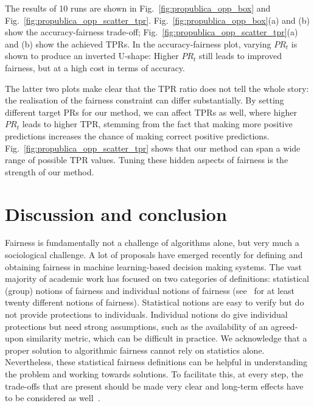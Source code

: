 The results of 10 runs are shown in Fig.~\ref{fig:propublica_opp_box} and Fig.~\ref{fig:propublica_opp_scatter_tpr}.
Fig.~\ref{fig:propublica_opp_box}(a) and (b) show the accuracy-fairness trade-off;
Fig.~\ref{fig:propublica_opp_scatter_tpr}(a) and (b) show the achieved TPRs.
In the accuracy-fairness plot, varying $\mathit{PR}_t$ is shown to produce an inverted U-shape:
Higher $\mathit{PR}_t$ still leads to improved fairness, but at a high cost in terms of accuracy.

The latter two plots make clear that the TPR ratio does not tell the whole story:
the realisation of the fairness constraint can differ substantially.
By setting different target PRs for our method, we can affect TPRs as well,
where higher $\mathit{PR}_t$ leads to higher TPR,
stemming from the fact that making more positive predictions increases the chance of making correct positive predictions.
Fig.~\ref{fig:propublica_opp_scatter_tpr} shows that our method can span a wide range of possible TPR values.
Tuning these hidden aspects of fairness is the strength of our method.

\section{Discussion and conclusion}
Fairness is fundamentally not a challenge of algorithms alone, but very much a sociological challenge.
%
A lot of proposals have emerged recently for defining and obtaining fairness in machine learning-based decision making systems. 
%
The vast majority of academic work has focused on two categories of definitions: statistical (group) notions of fairness and individual notions of fairness (see~\cite{verma2018fairness} for at least twenty different notions of fairness).
%
Statistical notions are easy to verify but do not provide protections to individuals. 
%
Individual notions do give individual protections but need strong assumptions, such as the availability of an agreed-upon similarity metric, which can be difficult in practice.
%
We acknowledge that a proper solution to algorithmic fairness cannot rely on statistics alone.
%
Nevertheless, these statistical fairness definitions can be helpful in understanding the problem and working towards solutions.
%
To facilitate this, at every step, the trade-offs that are present should be made very clear
and long-term effects have to be considered as well~\citep{liu2018delayed,kallus2018residual}.

